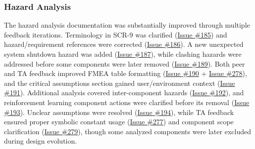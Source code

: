 \documentclass{article}
\begin{document}
\subsubsection{Hazard Analysis}

The hazard analysis documentation was substantially improved through multiple feedback iterations. Terminology in SCR-9 was clarified (\href{https://github.com/ssm-lab/capstone--source-code-optimizer/issues/185}{Issue \#185}) and hazard/requirement references were corrected (\href{https://github.com/ssm-lab/capstone--source-code-optimizer/issues/186}{Issue \#186}). A new unexpected system shutdown hazard was added (\href{https://github.com/ssm-lab/capstone--source-code-optimizer/issues/187}{Issue \#187}), while clashing hazards were addressed before some components were later removed (\href{https://github.com/ssm-lab/capstone--source-code-optimizer/issues/189}{Issue \#189}). Both peer and TA feedback improved FMEA table formatting (\href{https://github.com/ssm-lab/capstone--source-code-optimizer/issues/190}{Issue \#190} + \href{https://github.com/ssm-lab/capstone--source-code-optimizer/issues/278}{Issue \#278}), and the critical assumptions section gained user/environment context (\href{https://github.com/ssm-lab/capstone--source-code-optimizer/issues/191}{Issue \#191}). Additional analysis covered inter-component hazards (\href{https://github.com/ssm-lab/capstone--source-code-optimizer/issues/192}{Issue \#192}), and reinforcement learning component actions were clarified before its removal (\href{https://github.com/ssm-lab/capstone--source-code-optimizer/issues/193}{Issue \#193}). Unclear assumptions were resolved (\href{https://github.com/ssm-lab/capstone--source-code-optimizer/issues/194}{Issue \#194}), while TA feedback ensured proper symbolic constant usage (\href{https://github.com/ssm-lab/capstone--source-code-optimizer/issues/277}{Issue \#277}) and component scope clarification (\href{https://github.com/ssm-lab/capstone--source-code-optimizer/issues/279}{Issue \#279}), though some analyzed components were later excluded during design evolution.
\end{document}
